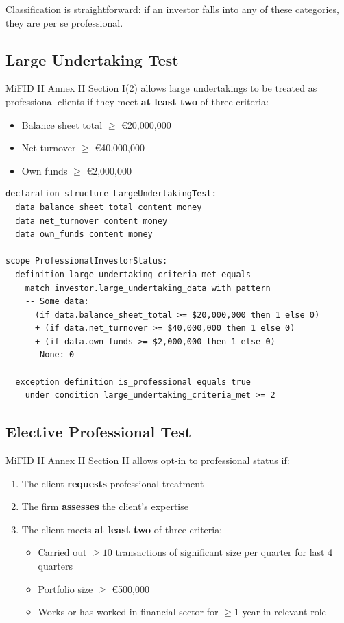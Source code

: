 Classification is straightforward: if an investor falls into any of these categories, they are per se professional.

\subsection{Large Undertaking Test}
\label{sec:large-undertaking}

MiFID II Annex II Section I(2) allows large undertakings to be treated as professional clients if they meet \textbf{at least two} of three criteria:

\begin{itemize}
  \item Balance sheet total $\geq$ €20,000,000
  \item Net turnover $\geq$ €40,000,000
  \item Own funds $\geq$ €2,000,000
\end{itemize}

\begin{lstlisting}
declaration structure LargeUndertakingTest:
  data balance_sheet_total content money
  data net_turnover content money
  data own_funds content money

scope ProfessionalInvestorStatus:
  definition large_undertaking_criteria_met equals
    match investor.large_undertaking_data with pattern
    -- Some data:
      (if data.balance_sheet_total >= $20,000,000 then 1 else 0)
      + (if data.net_turnover >= $40,000,000 then 1 else 0)
      + (if data.own_funds >= $2,000,000 then 1 else 0)
    -- None: 0

  exception definition is_professional equals true
    under condition large_undertaking_criteria_met >= 2
\end{lstlisting}

\subsection{Elective Professional Test}
\label{sec:elective}

MiFID II Annex II Section II allows opt-in to professional status if:

\begin{enumerate}
  \item The client \textbf{requests} professional treatment
  \item The firm \textbf{assesses} the client's expertise
  \item The client meets \textbf{at least two} of three criteria:
  \begin{itemize}
    \item Carried out $\geq 10$ transactions of significant size per quarter for last 4 quarters
    \item Portfolio size $\geq$ €500,000
    \item Works or has worked in financial sector for $\geq 1$ year in relevant role
  \end{itemize}
\end{enumerate}

